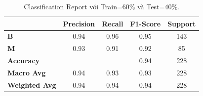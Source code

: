 \begin{table}[h!]
	\centering
	\begin{tabular}{|l|c|c|c|c|}
		\hline
		\textbf{} & \textbf{Precision} & \textbf{Recall} & \textbf{F1-Score} & \textbf{Support} \\ \hline
		\textbf{B} & 0.94 & 0.96 & 0.95 & 143 \\ \hline
		\textbf{M} & 0.93 & 0.91 & 0.92 & 85 \\ \hline
		\textbf{Accuracy} & \multicolumn{2}{c|}{} & 0.94 & 228 \\ \hline
		\textbf{Macro Avg} & 0.94 & 0.93 & 0.93 & 228 \\ \hline
		\textbf{Weighted Avg} & 0.94 & 0.94 & 0.94 & 228 \\ \hline
	\end{tabular}
	\caption{Classification Report với Train=60\% và Test=40\%.}
\end{table}

